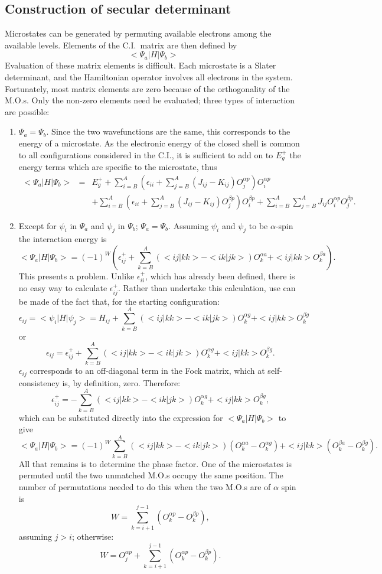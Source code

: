\subsection{Construction of secular determinant}
Microstates can be generated by permuting available electrons among the
available levels. Elements of the C.I.\ matrix are then defined by
$$
<\Psi_a|H|\Psi_b>
$$
Evaluation of these matrix elements is difficult. Each microstate is a Slater
determinant, and the Hamiltonian operator involves all electrons in the system.
Fortunately, most matrix elements are zero because of the orthogonality of the
M.O.s. Only the non-zero elements need be evaluated; three types of interaction
are possible:
\begin{enumerate}
\item $\Psi_a=\Psi_b$. Since the two wavefunctions are the same,
this corresponds to the energy of a microstate. As the
electronic energy of the closed shell is common to all
configurations considered in the C.I., it is sufficient to
add on to $E_g^+$ the energy terms which are specific to the
microstate, thus
\begin{eqnarray}
<\Psi_a|H|\Psi_b>& =& E_g^+ +\sum_{i=B}^A\left(\epsilon_{ii}+\sum_{j=B}^A(J_{ij}-K_{ij})
O_j^{\alpha p} \right )O_i^{\alpha p} \nonumber  \\&&
+\sum_{i=B}^A\left(\epsilon_{ii}+\sum_{j=B}^A(J_{ij}-K_{ij}) O_j^{\beta p}
\right )O_i^{\beta p} + \sum_{i=B}^A\sum_{j=B}^AJ_{ij}O_i^{\alpha p}
O_j^{\beta p}. \nonumber
\end{eqnarray}
\item \label{b} Except for $\psi_i$ in $\Psi_a$ and  $\psi_j$ in $\Psi_b$;
$\Psi_a = \Psi_b$. Assuming $\psi_i$  and $\psi_j$  to be $\alpha$-spin the
interaction energy is
$$
<\Psi_a|H|\Psi_b> = (-1)^W(\epsilon_{ij}^++\sum_{k=B}^A(<ij|kk>-<ik|jk>)O_k^{\alpha a}
+<ij|kk>O_k^{\beta a}).
$$
This presents a problem. Unlike $\epsilon_{ii}^+$, which has already been
defined, there is no easy way to calculate $\epsilon_{ij}^+$. Rather than
undertake this calculation, use can be made of the fact that, for the starting
configuration:
$$
\epsilon_{ij} = <\psi_i|H|\psi_j> = H_{ij} +
\sum_{k=B}^A(<ij|kk>-<ik|jk>)O_k^{\alpha g}
+<ij|kk>O_k^{\beta g}
$$
or
$$
\epsilon_{ij} = \epsilon_{ij}^+ + \sum_{k=B}^A(<ij|kk>-<ik|jk>)O_k^{\alpha g}
+<ij|kk>O_k^{\beta g} .
$$
$\epsilon_{ij}$ corresponds to an off-diagonal term in the Fock matrix,
which at self-consistency is, by definition, zero.
Therefore:
$$
\epsilon_{ij}^+ = - \sum_{k=B}^A(<ij|kk>-<ik|jk>)O_k^{\alpha g}
+<ij|kk>O_k^{\beta g}  ,
$$
which can be substituted directly into the expression for
$<\Psi_a|H|\Psi_b>$ to give
$$
<\Psi_a|H|\Psi_b> = (-1)^W\sum_{k=B}^A(<ij|kk>-<ik|jk>)(O_k^{\alpha a}-O_k^{\alpha g})
+<ij|kk>(O_k^{\beta a} -O_k^{\beta g} ).
$$
All that remains is to determine the phase factor. One
of the microstates is permuted until the two unmatched M.O.s
occupy the same position. The number of permutations needed
to do this when the two M.O.s are of $\alpha$ spin is
$$
W=\sum_{k=i+1}^{j-1}(O_k^{\alpha p}-O_k^{\beta p}),
$$
assuming $j > i$; otherwise:
$$
W=O_j^{\alpha p} +\sum_{k=i+1}^{j-1}(O_k^{\alpha p}-O_k^{\beta p}).
$$


\end{enumerate}
